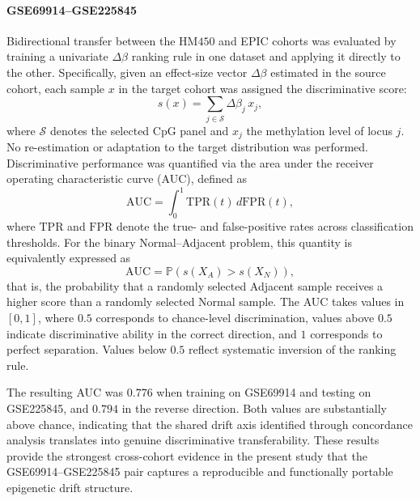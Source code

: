 \paragraph{GSE69914--GSE225845}
Bidirectional transfer between the HM$450$ and EPIC cohorts was 
evaluated by training a univariate $\Delta\beta$ ranking rule in one 
dataset and applying it directly to the other. 
Specifically, given an effect-size vector $\Delta\beta$ estimated 
in the source cohort, each sample $x$ in the target cohort was 
assigned the discriminative score:
\begin{equation}
s(x) = \sum_{j \in \mathcal{S}} \Delta\beta_j \, x_j ,
\end{equation}
where $\mathcal{S}$ denotes the selected CpG panel and $x_j$ the 
methylation level of locus $j$. 
No re-estimation or adaptation to the target distribution was performed.
Discriminative performance was quantified via the area under the 
receiver operating characteristic curve (AUC), defined as
\begin{equation}
\mathrm{AUC}
=
\int_0^1 \mathrm{TPR}(t)\, d\mathrm{FPR}(t),
\end{equation}
where $\mathrm{TPR}$ and $\mathrm{FPR}$ denote the true- and false-positive 
rates across classification thresholds. 
For the binary Normal–Adjacent problem, this quantity is 
equivalently expressed as
\begin{equation}
\mathrm{AUC}
=
\mathbb{P}\!\left(
s(X_{A}) > s(X_{N})
\right),
\end{equation}
that is, the probability that a randomly selected Adjacent sample 
receives a higher score than a randomly selected Normal sample. 
The AUC takes values in $[0,1]$, where $0.5$ corresponds to 
chance-level discrimination, values above $0.5$ indicate 
discriminative ability in the correct direction, and $1$ 
corresponds to perfect separation. Values below $0.5$ 
reflect systematic inversion of the ranking rule.

The resulting AUC was $0.776$ when training on GSE69914 and 
testing on GSE225845, and $0.794$ in the reverse direction. 
Both values are substantially above chance, indicating that the 
shared drift axis identified through concordance analysis 
translates into genuine discriminative transferability. 
These results provide the strongest cross-cohort evidence in 
the present study that the GSE69914--GSE225845 pair captures 
a reproducible and functionally portable epigenetic drift structure.

